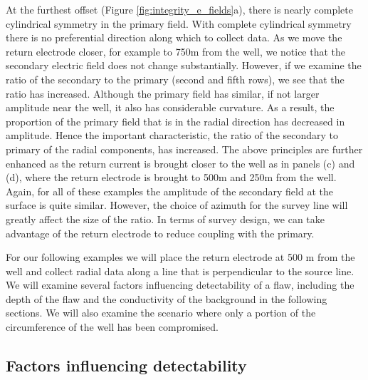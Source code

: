

At the furthest offset (Figure \ref{fig:integrity_e_fields}a), there is nearly complete cylindrical symmetry in the primary field. With complete cylindrical symmetry there is no preferential direction along which to collect data. As we move the return electrode closer, for example to 750m from the well, we notice that the secondary electric field does not change substantially. However, if we examine the ratio of the secondary to the primary (second and fifth rows), we see that the ratio has increased. Although the primary field has similar, if not larger amplitude near the well, it also has considerable curvature. As a result, the proportion of the primary field that is in the radial direction has decreased in amplitude. Hence the important characteristic, the ratio of the secondary to primary of the radial components, has increased. The above principles are further enhanced as the return current is brought closer to the well as in panels (c) and (d), where the return electrode is brought to 500m and 250m from the well.  Again, for all of these examples the amplitude of the secondary field at the surface is quite similar. However, the choice of azimuth for the survey line will greatly affect the size of the ratio. In terms of survey design, we can take advantage of the return electrode to reduce coupling with the primary.

For our following examples we will place the return electrode at 500 m from the well and collect radial data along a line that is perpendicular to the source line. We will examine several factors influencing detectability of a flaw, including the depth of the flaw and the conductivity of the background in the following sections. We will also examine the scenario where only a portion of the circumference of the well has been compromised.


\subsection{Factors influencing detectability}
